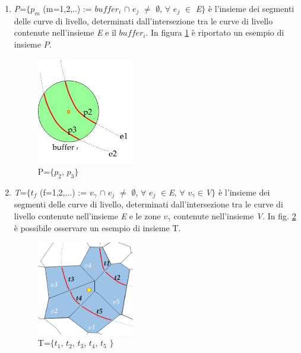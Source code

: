 \begin{enumerate}
\item\textit{P}=$\{$$p_m$ (m=1,2,..) := $buffer_i$ $\cap$ $e_j$ $\neq$ $\emptyset$, $\forall$ $e_j$ $\in$ \textit{E}$\}$ è l'insieme dei segmenti delle curve di livello, determinati dall'intersezione tra le curve di livello contenute nell'insieme \textit{E} e il $buffer_i$. In figura \ref{fig:p} è riportato un esempio di insieme $P$.
\begin{figure}[h]
\centering
\includegraphics[width=0.4\textwidth]{img/P}
\caption{P=$\{$$p_2$, $p_3$$\}$}
\label{fig:p}
\end{figure}
\newpage
\item\textit{T}=$\{$$t_f$ (f=1,2,...) := $v_\gamma$ $\cap$ $e_j$ $\neq$ $\emptyset$, $\forall$ $e_j$ $\in$\textit{E}, $\forall$ $v_\gamma$$\in$\textit{V}$\}$ è l'insieme dei segmenti delle curve di livello, determinati dall'intersezione tra le curve di livello contenute nell'insieme \textit{E} e le zone $v_\gamma$ contenute nell'insieme \textit{V}. In fig. \ref{fig:t} è possibile osservare un esempio di insieme T.
\begin{figure}[h]
\centering
\includegraphics[width=0.4\textwidth]{img/T}
\caption{T=$\{$$t_1$, $t_2$, $t_3$, $t_4$, $t_5$ $\}$}
\label{fig:t}
\end{figure}


\end{enumerate}
